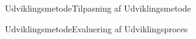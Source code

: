 \begin{frame}{Udviklingsmetode}{Tilpasning af Udviklingsmetode}



\end{frame}

\begin{frame}{Udviklingsmetode}{Evaluering af Udviklingsproces}
	
\end{frame}